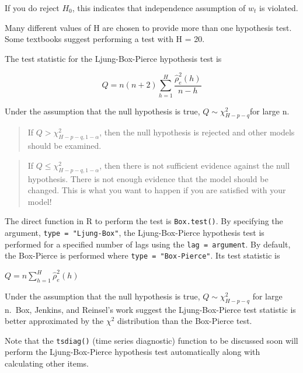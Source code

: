 \documentclass[
]{book}
\theoremstyle{definition}
\theoremstyle{definition}
\theoremstyle{definition}
\theoremstyle{definition}
\theoremstyle{remark}
\begin{document}
If you do reject \(H_0\), this indicates that independence assumption of \(w_t\) is violated.

Many different values of H are chosen to provide more than one hypothesis test. Some textbooks suggest performing a test with H = 20.

The test statistic for the Ljung-Box-Pierce hypothesis test is

\[Q=n(n+2)\sum_{h=1}^{H}\frac{\hat\rho_e^2(h)}{n-h}\]

Under the assumption that the null hypothesis is true, \(Q \sim \chi^2_{H-p-q}\)for large n.~

\begin{quote}
If \(Q > \chi^2_{H-p-q, 1-\alpha}\), then the null hypothesis is rejected and other models should be examined.
\end{quote}

\begin{quote}
If \(Q \le \chi^2_{H-p-q, 1-\alpha}\), then there is not sufficient evidence against the null hypothesis. There is not enough evidence that the model should be changed. This is what you want to happen if you are satisfied with your model!
\end{quote}

The direct function in R to perform the test is \texttt{Box.test()}. By specifying the argument, \texttt{type\ =\ "Ljung-Box"}, the Ljung-Box-Pierce hypothesis test is performed for a specified number of lags using the \texttt{lag\ =\ argument}. By default, the Box-Pierce is performed where \texttt{type\ =\ "Box-Pierce"}. Its test statistic is

\(Q=n\sum_{h=1}^{H}\hat\rho_e^2(h)\)

Under the assumption that the null hypothesis is true, \(Q \sim \chi^2_{H-p-q}\) for large n.~Box, Jenkins, and Reinsel's work suggest the Ljung-Box-Pierce test statistic is better approximated by the \(\chi^2\) distribution than the Box-Pierce test.

Note that the \texttt{tsdiag()} (time series diagnostic) function to be discussed soon will perform the Ljung-Box-Pierce hypothesis test automatically along with calculating other items.
\end{document}

